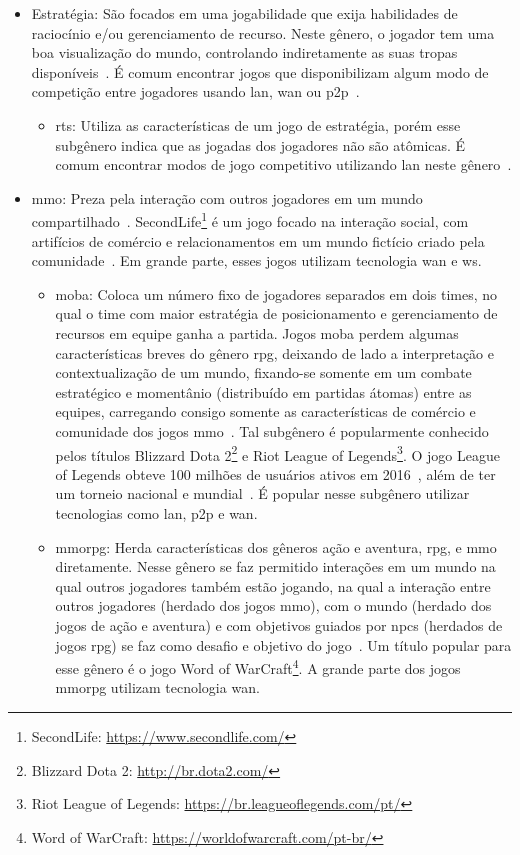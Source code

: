 \begin{itemize}
  \item Estratégia: São focados em uma jogabilidade que exija habilidades de raciocínio e/ou gerenciamento de recurso. Neste gênero, o jogador tem uma boa visualização do mundo, controlando indiretamente as suas tropas disponíveis~\cite{rollings2003andrew}. É comum encontrar jogos que disponibilizam algum modo de competição entre jogadores usando \ac{lan}, \ac{wan} ou \ac{p2p}~\cite{adams_1208533}.
    \begin{itemize}
      \item \ac{rts}: Utiliza as características de um jogo de estratégia, porém esse subgênero indica que as jogadas dos jogadores não são atômicas. É comum encontrar modos de jogo competitivo utilizando \ac{lan} neste gênero~\cite{adams_1208533}.
    \end{itemize}
  \item \ac{mmo}: Preza pela interação com outros jogadores em um mundo compartilhado~\cite{adams_1208533}. SecondLife\footnote{SecondLife: \url{https://www.secondlife.com/}} é um jogo focado na interação social, com artifícios de comércio e relacionamentos em um mundo fictício criado pela comunidade~\cite{tecmundo_secondlife}. Em grande parte, esses jogos utilizam tecnologia \ac{wan} e \ac{ws}.
    \begin{itemize}
      \item \ac{moba}: Coloca um número fixo de jogadores separados em dois times, no qual o time com maior estratégia de posicionamento e gerenciamento de recursos em equipe ganha a partida. Jogos \ac{moba} perdem algumas características breves do gênero \ac{rpg}, deixando de lado a interpretação e contextualização de um mundo, fixando-se somente em um combate estratégico e momentânio (distribuído em partidas átomas) entre as equipes, carregando consigo somente as características de comércio e comunidade dos jogos \ac{mmo}~\cite{adams_1208533}. Tal subgênero é popularmente conhecido pelos títulos Blizzard Dota 2\footnote{Blizzard Dota 2: \url{http://br.dota2.com/}} e Riot League of Legends\footnote{Riot League of Legends: \url{https://br.leagueoflegends.com/pt/}}. O jogo League of Legends obteve 100 milhões de usuários ativos em 2016~\cite{lol_statista}, além de ter um torneio nacional e mundial~\cite{lol_sportv}. É popular nesse subgênero utilizar tecnologias como \ac{lan}, \ac{p2p} e \ac{wan}.
      \item \ac{mmorpg}: Herda características dos gêneros ação e aventura, \ac{rpg}, e \ac{mmo} diretamente. Nesse gênero se faz permitido interações em um mundo na qual outros jogadores também estão jogando, na qual a interação entre outros jogadores (herdado dos jogos \ac{mmo}), com o mundo (herdado dos jogos de ação e aventura) e com objetivos guiados por \ac{npcs} (herdados de jogos \ac{rpg}) se faz como desafio e objetivo do jogo~\cite{adams_1208533}. Um título popular para esse gênero é o jogo Word of WarCraft\footnote{Word of WarCraft: \url{https://worldofwarcraft.com/pt-br/}}. A grande parte dos jogos \ac{mmorpg} utilizam tecnologia \ac{wan}.

\end{itemize}
\end{itemize}
